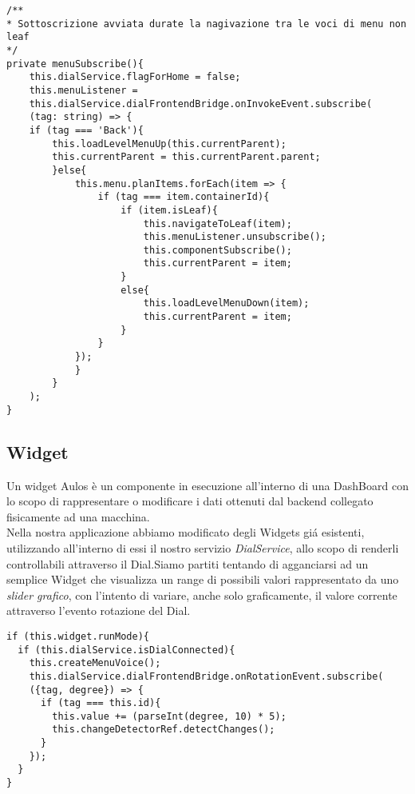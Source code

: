 \vspace{1.0cm}
\begin{lstlisting}[caption={Metodo menuSubscribe},style=javaScriptCode]
/**
* Sottoscrizione avviata durate la nagivazione tra le voci di menu non leaf
*/
private menuSubscribe(){
	this.dialService.flagForHome = false;
	this.menuListener = 
	this.dialService.dialFrontendBridge.onInvokeEvent.subscribe(
	(tag: string) => {
	if (tag === 'Back'){
		this.loadLevelMenuUp(this.currentParent);
		this.currentParent = this.currentParent.parent;
		}else{
			this.menu.planItems.forEach(item => {
				if (tag === item.containerId){
					if (item.isLeaf){
						this.navigateToLeaf(item);
						this.menuListener.unsubscribe();
						this.componentSubscribe();
						this.currentParent = item;
					}
					else{
						this.loadLevelMenuDown(item);
						this.currentParent = item;
					}
				}
			});
			}
		}
	);
}

\end{lstlisting} 
\vspace{1.0cm}

\subsection{Widget}

Un widget Aulos è un componente in esecuzione all’interno di una DashBoard con lo scopo di rappresentare o modificare i dati ottenuti dal backend collegato fisicamente ad una macchina.\\

Nella nostra applicazione abbiamo modificato degli Widgets giá esistenti, utilizzando all'interno di essi il nostro servizio \emph{DialService}, allo scopo di renderli controllabili attraverso il Dial.Siamo partiti tentando di agganciarsi ad un semplice Widget che visualizza un range di possibili valori rappresentato da uno \emph{slider grafico}, con l'intento di variare, anche solo graficamente, il valore corrente attraverso l'evento rotazione del Dial.\\

\begin{lstlisting}[caption={Sottoscrizione evento rotazione Radial Gauge},style=javaScriptCode]
if (this.widget.runMode){
  if (this.dialService.isDialConnected){
	this.createMenuVoice();
	this.dialService.dialFrontendBridge.onRotationEvent.subscribe(
	({tag, degree}) => {
	  if (tag === this.id){
		this.value += (parseInt(degree, 10) * 5);
		this.changeDetectorRef.detectChanges();
	  }
	});
  }
}
\end{lstlisting} 


